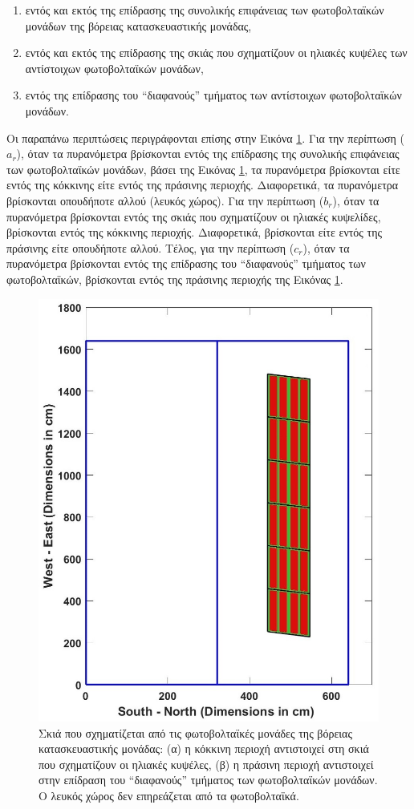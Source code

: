 \documentclass[12pt, a4paper]{report} %
\newcommand{\english}{\foreignlanguage{english}}
\begin{document}
\begin{enumerate}[label=(\english{\alph*$_r$})]
    \item εντός και εκτός της επίδρασης της συνολικής επιφάνειας των φωτοβολταϊκών μονάδων της βόρειας κατασκευαστικής μονάδας,
    \item εντός και εκτός της επίδρασης της σκιάς που σχηματίζουν οι ηλιακές κυψέλες των αντίστοιχων φωτοβολταϊκών μονάδων,
    \item εντός της επίδρασης του “διαφανούς” τμήματος των αντίστοιχων φωτοβολταϊκών μονάδων.
\end{enumerate}

Οι παραπάνω περιπτώσεις περιγράφονται επίσης στην Εικόνα \ref{fig_valid_fig}. Για την περίπτωση (\english{$a_r$}), όταν τα 
πυρανόμετρα βρίσκονται εντός της επίδρασης της συνολικής επιφάνειας των φωτοβολταϊκών μονάδων, βάσει της Εικόνας \ref{fig_valid_fig}, 
τα πυρανόμετρα βρίσκονται είτε εντός της κόκκινης είτε εντός της πράσινης περιοχής. Διαφορετικά, τα πυρανόμετρα βρίσκονται 
οπουδήποτε αλλού (λευκός χώρος). Για την περίπτωση (\english{$b_r$}), όταν τα πυρανόμετρα βρίσκονται εντός της σκιάς που 
σχηματίζουν οι ηλιακές κυψελίδες, βρίσκονται εντός της κόκκινης περιοχής. Διαφορετικά, βρίσκονται είτε εντός της πράσινης είτε 
οπουδήποτε αλλού. Τέλος, για την περίπτωση (\english{$c_r$}), όταν τα πυρανόμετρα βρίσκονται εντός της επίδρασης του “διαφανούς” 
τμήματος των φωτοβολταϊκών, βρίσκονται εντός της πράσινης περιοχής της Εικόνας \ref{fig_valid_fig}.

\begin{figure}[H]
    \centering
    \includegraphics[width=.6\linewidth]{valid_fig.jpg}
    \caption{Σκιά που σχηματίζεται από τις φωτοβολταϊκές μονάδες της βόρειας κατασκευαστικής μονάδας: (α) η κόκκινη περιοχή 
    αντιστοιχεί στη σκιά που σχηματίζουν οι ηλιακές κυψέλες, (β) η πράσινη περιοχή αντιστοιχεί στην επίδραση του “διαφανούς” 
    τμήματος των φωτοβολταϊκών μονάδων. Ο λευκός χώρος δεν επηρεάζεται από τα φωτοβολταϊκά.}
    \label{fig_valid_fig}
\end{figure}
\end{document}
